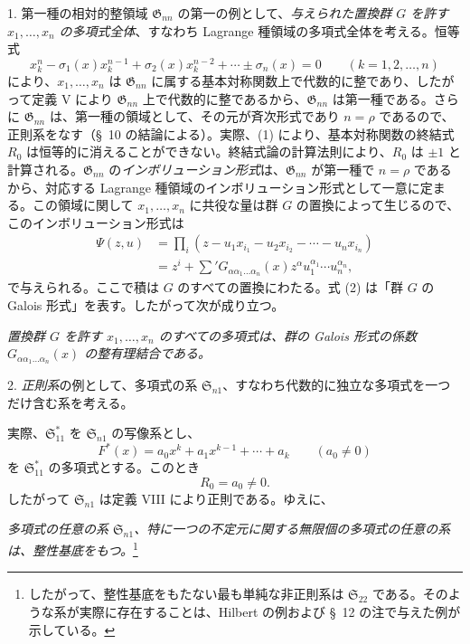 \documentclass[11pt]{jlreq}
\providecommand{\Ssys}{\mathfrak{S}}
\providecommand{\Gdom}{\mathfrak{G}}
\begin{document}
1. 第一種の相対的整領域 $\Gdom_{nn}$ の第一の例として、\emph{与えられた置換群 $G$ を許す $x_1,\ldots,x_n$ の多項式全体}、すなわち Lagrange 種領域の多項式全体を考える。恒等式
\begin{equation}
  x_k^n-\sigma_1(x)x_k^{n-1}+\sigma_2(x)x_k^{n-2}+\cdots\pm\sigma_n(x)=0
  \qquad(k=1,2,
\ldots,n)
\tag{1}
\end{equation}
により、$x_1,\ldots,x_n$ は $\Gdom_{nn}$ に属する基本対称関数上で代数的に整であり、したがって定義 V により $\Gdom_{nn}$ 上で代数的に整であるから、$\Gdom_{nn}$ は第一種である。さらに $\Gdom_{nn}$ は、第一種の領域として、その元が斉次形式であり $n=\rho$ であるので、正則系をなす（\S\ 10 の結論による）。実際、(1) により、基本対称関数の終結式 $R_0$ は恒等的に消えることができない。終結式論の計算法則により、$R_0$ は $\pm1$ と計算される。$\Gdom_{nn}$ の\emph{インボリューション形式}は、$\Gdom_{nn}$ が第一種で $n=\rho$ であるから、対応する Lagrange 種領域のインボリューション形式として一意に定まる。この領域に関して $x_1,\ldots,x_n$ に共役な量は群 $G$ の置換によって生じるので、このインボリューション形式は
\begin{equation}
\begin{aligned}
  \Psi(z,u)&=\prod_i
  (z-u_1x_{i_1}-u_2x_{i_2}-\cdots-u_nx_{i_n})\\
  &=z^i+\sum{}'G_{\alpha\alpha_1\ldots\alpha_n}(x)
  z^\alpha u_1^{\alpha_1}\cdots u_n^{\alpha_n},
\end{aligned}
\tag{2}
\end{equation}
で与えられる。ここで積は $G$ のすべての置換にわたる。式 (2) は「群 $G$ の Galois 形式」を表す。したがって次が成り立つ。

\emph{置換群 $G$ を許す $x_1,\ldots,x_n$ のすべての多項式は、群の Galois 形式の係数 $G_{\alpha\alpha_1\ldots\alpha_n}(x)$ の整有理結合である。}

2. \emph{正則系}の例として、多項式の系 $\Ssys_{n1}$、すなわち代数的に独立な多項式を一つだけ含む系を考える。

実際、$\Ssys^*_{11}$ を $\Ssys_{n1}$ の写像系とし、
\[
  F^*(x)=a_0x^k+a_1x^{k-1}+\cdots+a_k\qquad(a_0\ne0)
\]
を $\Ssys^*_{11}$ の多項式とする。このとき
\begin{equation}
  R_0=a_0\ne0.
\tag{3}
\end{equation}
したがって $\Ssys_{n1}$ は定義 VIII により正則である。ゆえに、

\emph{多項式の任意の系 $\Ssys_{n1}$、特に一つの不定元に関する無限個の多項式の任意の系は、整性基底をもつ。}\footnote{したがって、整性基底をもたない最も単純な非正則系は $\Ssys_{22}$ である。そのような系が実際に存在することは、Hilbert の例および \S\ 12 の注で与えた例が示している。}
\end{document}
